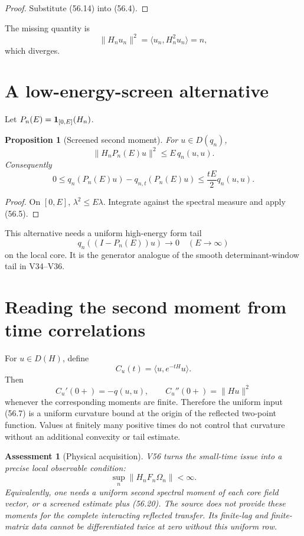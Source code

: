\documentclass[11pt]{article}
\newtheorem{proposition}[theorem]{Proposition}
\newtheorem{assessment}[theorem]{Assessment}
\theoremstyle{remark}
\begin{document}
\begin{proof}
Substitute (56.14) into (56.4).
\end{proof}

The missing quantity is
\[
 \|H_nu_n\|^2
 =\langle u_n,H_n^2u_n\rangle=n,                        \tag{56.17}
\]
which diverges.

\section{A low-energy-screen alternative}

Let \(P_n(E)={\bf1}_{[0,E]}(H_n)\).

\begin{proposition}[Screened second moment]
\label{prop:v15v56-screen}
For \(u\in D(q_n)\),
\[
 \|H_nP_n(E)u\|^2
 \leq E\,q_n(u,u).                                      \tag{56.18}
\]
Consequently
\[
 0\leq q_n(P_n(E)u)-q_{n,t}(P_n(E)u)
 \leq\frac{tE}{2}q_n(u,u).                              \tag{56.19}
\]
\end{proposition}

\begin{proof}
On \([0,E]\), \(\lambda^2\leq E\lambda\).  Integrate against the
spectral measure and apply (56.5).
\end{proof}

This alternative needs a uniform high-energy form tail
\[
 q_n((I-P_n(E))u)\longrightarrow0
 \quad(E\to\infty)                                      \tag{56.20}
\]
on the local core.  It is the generator analogue of the smooth
determinant-window tail in V34--V36.

\section{Reading the second moment from time correlations}

For \(u\in D(H)\), define
\[
 C_u(t)=\langle u,e^{-tH}u\rangle.                      \tag{56.21}
\]
Then
\[
 C_u'(0+)=-q(u,u),\qquad
 C_u''(0+)=\|Hu\|^2                                    \tag{56.22}
\]
whenever the corresponding moments are finite.  Therefore the
uniform input (56.7) is a uniform curvature bound at the origin of
the reflected two-point function.  Values at finitely many positive
times do not control that curvature without an additional convexity
or tail estimate.

\begin{assessment}[Physical acquisition]
\label{ass:v15v56-status}
V56 turns the small-time issue into a precise local observable
condition:
\[
 \sup_n\|H_nF_n\Omega_n\|<\infty.                       \tag{56.23}
\]
Equivalently, one needs a uniform second spectral moment of each
core field vector, or a screened estimate plus (56.20).  The source
does not provide these moments for the complete interacting
reflected transfer.  Its finite-lag and finite-matrix data cannot
be differentiated twice at zero without this uniform row.
\end{assessment}
\end{document}

